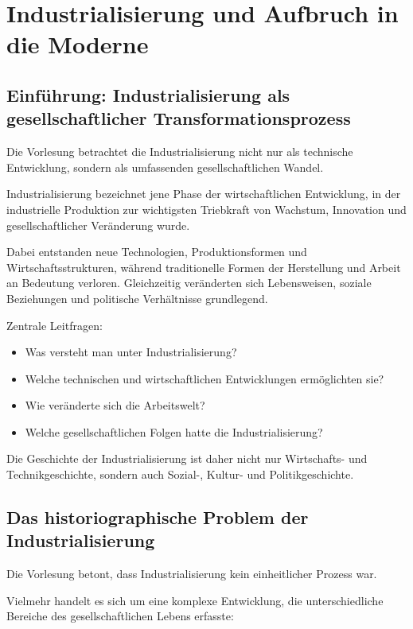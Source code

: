 \section{Industrialisierung und Aufbruch in die Moderne}

\subsection{Einführung: Industrialisierung als gesellschaftlicher Transformationsprozess}

Die Vorlesung betrachtet die Industrialisierung nicht nur als technische Entwicklung,
sondern als umfassenden gesellschaftlichen Wandel.

Industrialisierung bezeichnet jene Phase der wirtschaftlichen Entwicklung,
in der industrielle Produktion zur wichtigsten Triebkraft von Wachstum,
Innovation und gesellschaftlicher Veränderung wurde.

Dabei entstanden neue Technologien, Produktionsformen und Wirtschaftsstrukturen,
während traditionelle Formen der Herstellung und Arbeit an Bedeutung verloren. Gleichzeitig veränderten sich Lebensweisen, soziale Beziehungen und politische Verhältnisse grundlegend.

Zentrale Leitfragen:

\begin{itemize}
    \item Was versteht man unter Industrialisierung?
    \item Welche technischen und wirtschaftlichen Entwicklungen ermöglichten sie?
    \item Wie veränderte sich die Arbeitswelt?
    \item Welche gesellschaftlichen Folgen hatte die Industrialisierung?
\end{itemize}

Die Geschichte der Industrialisierung ist daher nicht nur Wirtschafts- und Technikgeschichte,
sondern auch Sozial-, Kultur- und Politikgeschichte.

\subsection{Das historiographische Problem der Industrialisierung}

Die Vorlesung betont, dass Industrialisierung kein einheitlicher Prozess war.

Vielmehr handelt es sich um eine komplexe Entwicklung,
die unterschiedliche Bereiche des gesellschaftlichen Lebens erfasste:

